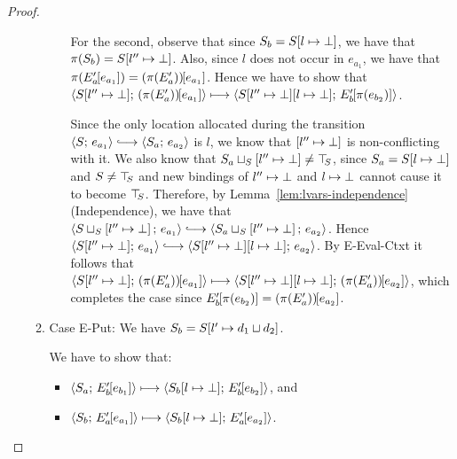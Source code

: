 \begin{proof}
\begin{enumerate}
\begin{enumerate}
\begin{itemize}
          For the second, observe that since $S_b =
          S[l \mapsto \bot]$, we have that $\pi(S_b) =
          S[l'' \mapsto \bot]$.  Also, since $l$ does not occur in
          $e_{a_1}$, we have that $\pi(E'_a\hspace{-1mm}\left[e_{a_1}\right]) =
          (\pi(E'_a))\hspace{-1mm}\left[e_{a_1}\right]$.  Hence we have to show
          that
          $\langle S[l'' \mapsto \bot];\, (\pi(E'_a))\hspace{-1mm}\left[e_{a_1}\right] \rangle
          \longmapsto
          \langle S[l'' \mapsto \bot][l \mapsto \bot];\, E'_b\hspace{-1mm}\left[\pi(e_{b_2})\right] \rangle$.

          Since the only location allocated during the transition
          $\config{S}{e_{a_1}} \parstepsto \config{S_a}{e_{a_2}}$ is
          $l$, we know that $\left[ l'' \mapsto \bot \right]$ is
          non-conflicting with it.  We also know that
          $S_a \sqcup_{S} \left[ l'' \mapsto \bot \right] \neq
          \top\hspace{-0.85mm}_{S}$, since $S_a = S[l \mapsto \bot]$ and $S \neq
          \top\hspace{-0.85mm}_{S}$ and new bindings of $l'' \mapsto \bot$ and
          $l \mapsto \bot$ cannot cause it to become
          $\top\hspace{-0.85mm}_{S}$.  Therefore, by Lemma~\ref{lem:lvars-independence}
          (Independence), we have that
          $\config{\lubstore{S}{\store{\storebindingRaw{l''}{\bot}}}}{e_{a_1}}
          \parstepsto
          \config{\lubstore{S_a}{\store{\storebindingRaw{l''}{\bot}}}}{e_{a_2}}$.
          Hence $\config{\extSRaw{S}{l''}{\bot}}{e_{a_1}} \parstepsto
          \config{\extSRaw{\extSRaw{S}{l''}{\bot}}{l}{\bot}}{e_{a_2}}$.
          By {\sc E-Eval-Ctxt} it follows that
          $\langle S[l'' \mapsto \bot];\, (\pi(E'_a))\hspace{-1mm}\left[e_{a_1}\right] \rangle
          \longmapsto
          \langle S[l'' \mapsto \bot][l \mapsto \bot];\, (\pi(E'_a))\hspace{-1mm}\left[e_{a_2}\right] \rangle$,
          which completes the case since
          $E'_b\hspace{-1mm}\left[\pi(e_{b_2})\right] =
          (\pi(E'_a))\hspace{-1mm}\left[e_{a_2}\right]$.


      \end{itemize}

    \item \label{lvars-slc-new-put}Case {\sc E-Put}: We have $S_b =
      S[l' \mapsto d_1 \sqcup d_2]$.

      We have to show that:
      \begin{itemize}
      \item $\langle S_a;\, E'_b\hspace{-1mm}\left[e_{b_1}\right] \rangle \longmapsto
        \langle S_b[l \mapsto \bot];\, E'_b\hspace{-1mm}\left[e_{b_2}\right] \rangle$,
        and
      \item
        $\langle S_b;\, E'_a\hspace{-1mm}\left[e_{a_1}\right] \rangle \longmapsto
        \langle S_b[l \mapsto \bot];\, E'_a\hspace{-1mm}\left[e_{a_2}\right] \rangle$.
      \end{itemize}


\end{enumerate}
\end{enumerate}
\end{proof}
